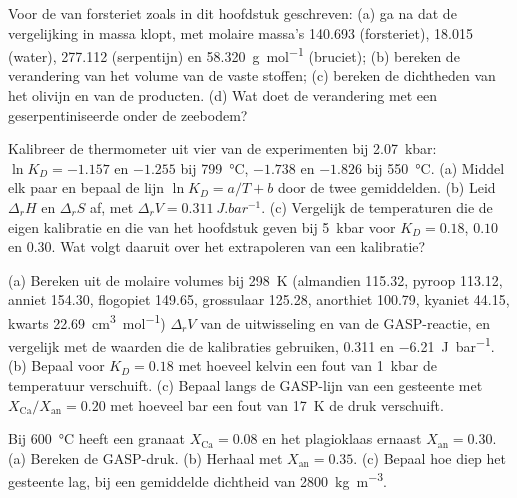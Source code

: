 \begin{exercise}[$\star$]\label{exo:b2:pt-paths:4}
Voor de  van forsteriet zoals in dit hoofdstuk geschreven: (a) ga na dat de
vergelijking in massa klopt, met molaire massa's 140.693 (forsteriet), 18.015 (water),
277.112 (serpentijn) en \qty{58.320}{g.mol^{-1}} (bruciet); (b) bereken de verandering van het
volume van de vaste stoffen; (c) bereken de dichtheden van het olivijn en van de producten.
(d) Wat doet de verandering met een geserpentiniseerde  onder de zeebodem?
\end{exercise}

\begin{exercise}[$\star\star$]\label{exo:b2:pt-paths:5}
Kalibreer de thermometer uit vier van de experimenten bij \qty{2.07}{kbar}: $\ln K_D =
-1.157$ en $-1.255$ bij \qty{799}{\celsius}, $-1.738$ en $-1.826$ bij \qty{550}{\celsius}.
(a) Middel elk paar en bepaal de lijn $\ln K_D = a/T + b$ door de twee gemiddelden.
(b) Leid $\Delta_r H$ en $\Delta_r S$ af, met $\Delta_r V = \qty{0.311}{J.bar^{-1}}$.
(c) Vergelijk de temperaturen die de eigen kalibratie en die van het hoofdstuk geven bij
\qty{5}{kbar} voor $K_D = 0.18$, $0.10$ en $0.30$. Wat volgt daaruit over het
extrapoleren van een kalibratie?
\end{exercise}

\begin{exercise}[$\star\star$]\label{exo:b2:pt-paths:6}
(a) Bereken uit de molaire volumes bij \qty{298}{K} (almandien 115.32, pyroop 113.12, anniet
154.30, flogopiet 149.65, grossulaar 125.28, anorthiet 100.79, kyaniet 44.15, kwarts
\qty{22.69}{cm^3.mol^{-1}}) $\Delta_r V$ van de uitwisseling en van de GASP-reactie,
en vergelijk met de waarden die de kalibraties gebruiken, \num{0.311} en
\qty{-6.21}{J.bar^{-1}}. (b) Bepaal voor $K_D = 0.18$ met hoeveel kelvin een fout van
\qty{1}{kbar} de temperatuur verschuift. (c) Bepaal langs de GASP-lijn van een gesteente met
$X_{\text{Ca}}/X_{\text{an}} = 0.20$ met hoeveel bar een fout van \qty{17}{K} de
druk verschuift.
\end{exercise}

\begin{exercise}[$\star\star$]\label{exo:b2:pt-paths:7}
Bij \qty{600}{\celsius} heeft een granaat $X_{\text{Ca}} = 0.08$ en het plagioklaas ernaast
$X_{\text{an}} = 0.30$. (a) Bereken de GASP-druk. (b) Herhaal met $X_{\text{an}} =
0.35$. (c) Bepaal hoe diep het gesteente lag, bij een gemiddelde dichtheid van \qty{2800}{kg.m^{-3}}.
\end{exercise}


